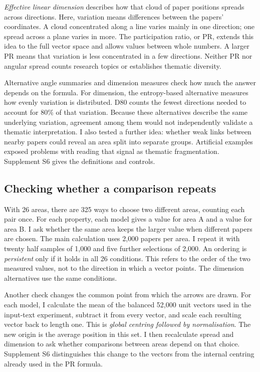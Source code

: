 \documentclass[12pt]{article}
\begin{document}
\emph{Effective linear dimension} describes how that cloud of paper positions spreads across directions. Here, variation means differences between the papers' coordinates. A cloud concentrated along a line varies mainly in one direction; one spread across a plane varies in more. The participation ratio, or PR, extends this idea to the full vector space and allows values between whole numbers. A larger PR means that variation is less concentrated in a few directions. Neither PR nor angular spread counts research topics or establishes thematic diversity.

Alternative angle summaries and dimension measures check how much the answer depends on the formula. For dimension, the entropy-based alternative measures how evenly variation is distributed. D80 counts the fewest directions needed to account for 80\% of that variation. Because these alternatives describe the same underlying variation, agreement among them would not independently validate a thematic interpretation. I also tested a further idea: whether weak links between nearby papers could reveal an area split into separate groups. Artificial examples exposed problems with reading that signal as thematic fragmentation. Supplement S6 gives the definitions and controls.

\subsection{Checking whether a comparison repeats}
With 26 areas, there are 325 ways to choose two different areas, counting each pair once. For each property, each model gives a value for area A and a value for area B. I ask whether the same area keeps the larger value when different papers are chosen. The main calculation uses 2,000 papers per area. I repeat it with twenty half samples of 1,000 and five further selections of 2,000. An ordering is \emph{persistent} only if it holds in all 26 conditions. This refers to the order of the two measured values, not to the direction in which a vector points. The dimension alternatives use the same conditions.

Another check changes the common point from which the arrows are drawn. For each model, I calculate the mean of the balanced 52,000 unit vectors used in the input-text experiment, subtract it from every vector, and scale each resulting vector back to length one. This is \emph{global centring followed by normalisation}. The new origin is the average position in this set. I then recalculate spread and dimension to ask whether comparisons between areas depend on that choice. Supplement S6 distinguishes this change to the vectors from the internal centring already used in the PR formula.
\end{document}
